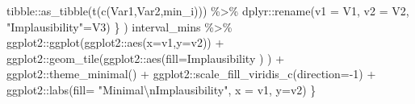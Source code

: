 \documentclass[
  12pt,
  a4paper,
  twoside]{book}
\newenvironment{Shaded}{\begin{snugshade}}{\end{snugshade}}
\newcommand{\AttributeTok}[1]{\textcolor[rgb]{0.77,0.63,0.00}{#1}}
\newcommand{\DecValTok}[1]{\textcolor[rgb]{0.00,0.00,0.81}{#1}}
\newcommand{\FunctionTok}[1]{\textcolor[rgb]{0.00,0.00,0.00}{#1}}
\newcommand{\NormalTok}[1]{#1}
\newcommand{\OtherTok}[1]{\textcolor[rgb]{0.56,0.35,0.01}{#1}}
\newcommand{\SpecialCharTok}[1]{\textcolor[rgb]{0.00,0.00,0.00}{#1}}
\newcommand{\StringTok}[1]{\textcolor[rgb]{0.31,0.60,0.02}{#1}}
\begin{document}
\begin{Shaded}
\begin{Highlighting}[]
\NormalTok{    tibble}\SpecialCharTok{::}\FunctionTok{as\_tibble}\NormalTok{(}\FunctionTok{t}\NormalTok{(}\FunctionTok{c}\NormalTok{(Var1,Var2,min\_i))) }\SpecialCharTok{\%\textgreater{}\%}
\NormalTok{      dplyr}\SpecialCharTok{::}\FunctionTok{rename}\NormalTok{(}\AttributeTok{v1 =}\NormalTok{ V1, }\AttributeTok{v2 =}\NormalTok{ V2, }\StringTok{"Implausibility"}\OtherTok{=}\NormalTok{V3) }
\NormalTok{  \} )}
\NormalTok{  interval\_mins }\SpecialCharTok{\%\textgreater{}\%}
\NormalTok{    ggplot2}\SpecialCharTok{::}\FunctionTok{ggplot}\NormalTok{(ggplot2}\SpecialCharTok{::}\FunctionTok{aes}\NormalTok{(}\AttributeTok{x=}\NormalTok{v1,}\AttributeTok{y=}\NormalTok{v2)) }\SpecialCharTok{+}
\NormalTok{    ggplot2}\SpecialCharTok{::}\FunctionTok{geom\_tile}\NormalTok{(ggplot2}\SpecialCharTok{::}\FunctionTok{aes}\NormalTok{(}\AttributeTok{fill=}\NormalTok{Implausibility ) ) }\SpecialCharTok{+}
\NormalTok{    ggplot2}\SpecialCharTok{::}\FunctionTok{theme\_minimal}\NormalTok{() }\SpecialCharTok{+} 
\NormalTok{    ggplot2}\SpecialCharTok{::}\FunctionTok{scale\_fill\_viridis\_c}\NormalTok{(}\AttributeTok{direction=}\SpecialCharTok{{-}}\DecValTok{1}\NormalTok{) }\SpecialCharTok{+}
\NormalTok{    ggplot2}\SpecialCharTok{::}\FunctionTok{labs}\NormalTok{(}\AttributeTok{fill=} \StringTok{"Minimal}\SpecialCharTok{\textbackslash{}n}\StringTok{Implausibility"}\NormalTok{,}
                  \AttributeTok{x =}\NormalTok{ v1, }\AttributeTok{y=}\NormalTok{v2) }
\NormalTok{\}}



\end{Highlighting}
\end{Shaded}
\end{document}
